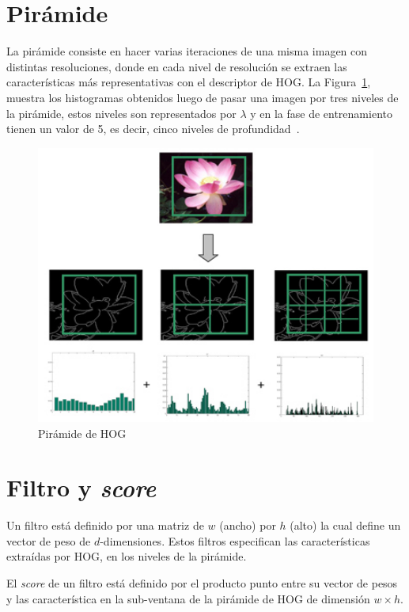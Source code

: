 \section{Pirámide}\label{sec:pyra}
La pirámide consiste en hacer varias iteraciones de una misma imagen con distintas resoluciones, donde en cada nivel de resolución se extraen las características más representativas con el descriptor de HOG\@. La Figura~\ref{fig:hog_pyra}, muestra los histogramas obtenidos luego de pasar una imagen por tres niveles de la pirámide, estos niveles son representados por $\lambda$ y en la fase de entrenamiento tienen un valor de 5, es decir, cinco niveles de profundidad~\cite{Felzenszwalb2010}.

\begin{figure}[tb]
  \centering
   \includegraphics[width=1\textwidth]{Figuras/phog.jpg}
   \caption[Pirámide de HOG]{Pirámide de HOG~\cite{pyra}}
   \label{fig:hog_pyra}
\end{figure}

\section{Filtro y \textit{score}}\label{sec:fas}

Un filtro está definido por una matriz de $w$ (ancho) por $h$ (alto) la cual define un vector de peso de $d$-dimensiones. Estos filtros especifican las características extraídas por HOG, en los niveles de la pirámide.

El \textit{score} de un filtro está definido por el producto punto entre su vector de pesos y las característica en la sub-ventana de la pirámide de HOG de dimensión $w \times h$.
